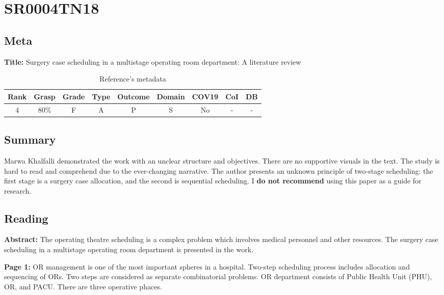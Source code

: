 \section{ SR0004TN18 }


\subsection{Meta}

    \textbf{Title:}
    Surgery case scheduling in a multistage operating room department: A literature review

    \begin{table}[H]
        \centering
        \begin{tabular}{|c|c|c|c|c|c|c|c|c|}
            \hline
                \textbf{Rank} & \textbf{Grasp} & \textbf{Grade} & \textbf{Type} & \textbf{Outcome} & \textbf{Domain} & \textbf{COV19} & \textbf{CoI} & \textbf{DB} \\
            \hline
                4 & 80\% & F & A & P & S & No & - & - \\
            \hline
        \end{tabular}
        \caption{Reference's metadata}
        \label{tab:SR0004TN18}
    \end{table}

\subsection{Summary}
    Marwa Khalfalli \cite{x104} demonstrated the work with an unclear structure and objectives. There are no supportive visuals in the text. The study is hard to read and comprehend due to the ever-changing narrative. The author presents an unknown principle of two-stage scheduling: the first stage is a surgery case allocation, and the second is sequential scheduling. I \textbf{do not recommend} using this paper as a guide for research.

\subsection{Reading}
    \textbf{Abstract:}
    The operating theatre scheduling is a complex problem which involves medical personnel and other resources. The surgery case scheduling in a multistage operating room department is presented in the work.

    \textbf{Page 1:}
    OR management is one of the most important spheres in a hospital. Two-step scheduling process includes allocation and sequencing of ORs. Two steps are considered as separate combinatorial problems. OR department consists of Public Health Unit (PHU), OR, and PACU. There are three operative phaces. 
    
